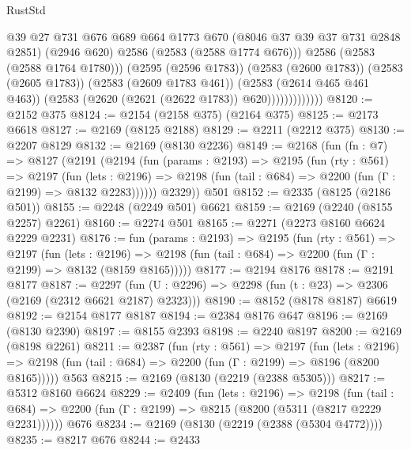\begin{lexlean}{RustStd}
\begin{coremodule}
                              @39
                              @27
                              @731
                              @676
                              @689
                              @664
                              @1773
                              @670
                              (@8046 @37 @39 @37 @731 @2848 @2851)
                              (@2946 @620)
                              @2586
                              (@2583 (@2588 @1774 @676)))
                            @2586
                            (@2583 (@2588 @1764 @1780)))
                          (@2595 (@2596 @1783))
                          (@2583 (@2600 @1783))
                          (@2583 (@2605 @1783))
                          (@2583 (@2609 @1783 @461))
                          (@2583 (@2614 @465 @461 @463))
                          (@2583 (@2620 (@2621 (@2622 @1783)) @620)))))))))))))
@8120 := @2152 @375
@8124 := @2154 (@2158 @375) (@2164 @375)
@8125 := @2173 @6618
@8127 := @2169 (@8125 @2188)
@8129 := @2211 (@2212 @375)
@8130 := @2207 @8129
@8132 := @2169 (@8130 @2236)
@8149 := @2168
    (fun (fn : @7) =>
    @8127
      (@2191
        (@2194
          (fun (params : @2193) =>
          @2195
            (fun (rty : @561) =>
            @2197
              (fun (lets : @2196) =>
              @2198 (fun (tail : @684) => @2200 (fun (Γ : @2199) => @8132 @2283))))))
        @2329))
    @501
@8152 := @2335 (@8125 (@2186 @501))
@8155 := @2248 (@2249 @501) @6621
@8159 := @2169 (@2240 (@8155 @2257) @2261)
@8160 := @2274 @501
@8165 := @2271 (@2273 @8160 @6624 @2229 @2231)
@8176 := fun (params : @2193) =>
  @2195
    (fun (rty : @561) =>
    @2197
      (fun (lets : @2196) =>
      @2198 (fun (tail : @684) => @2200 (fun (Γ : @2199) => @8132 (@8159 @8165)))))
@8177 := @2194 @8176
@8178 := @2191 @8177
@8187 := @2297 (fun (U : @2296) => @2298 (fun (t : @23) => @2306 (@2169 (@2312 @6621 @2187) @2323)))
@8190 := @8152 (@8178 @8187) @6619
@8192 := @2154 @8177 @8187
@8194 := @2384 @8176 @647
@8196 := @2169 (@8130 @2390)
@8197 := @8155 @2393
@8198 := @2240 @8197
@8200 := @2169 (@8198 @2261)
@8211 := @2387
    (fun (rty : @561) =>
    @2197
      (fun (lets : @2196) =>
      @2198 (fun (tail : @684) => @2200 (fun (Γ : @2199) => @8196 (@8200 @8165)))))
    @563
@8215 := @2169 (@8130 (@2219 (@2388 @5305)))
@8217 := @5312 @8160 @6624
@8229 := @2409
    (fun (lets : @2196) =>
    @2198
      (fun (tail : @684) => @2200 (fun (Γ : @2199) => @8215 (@8200 (@5311 (@8217 @2229 @2231))))))
    @676
@8234 := @2169 (@8130 (@2219 (@2388 (@5304 @4772))))
@8235 := @8217 @676
@8244 := @2433

\end{coremodule}
\end{lexlean}
